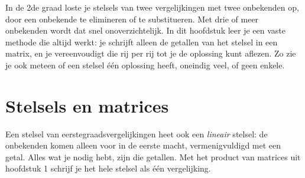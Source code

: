 %



In de 2de graad loste je stelsels van twee vergelijkingen met twee onbekenden op, door een onbekende te elimineren of te substitueren. Met drie of meer onbekenden wordt dat snel onoverzichtelijk. In dit hoofdstuk leer je een vaste methode die altijd werkt: je schrijft alleen de getallen van het stelsel in een matrix, en je vereenvoudigt die rij per rij tot je de oplossing kunt aflezen. Zo zie je ook meteen of een stelsel één oplossing heeft, oneindig veel, of geen enkele.

\begin{oefeningen}[Start]

\end{oefeningen}


\section{Stelsels en matrices}

Een stelsel van eerstegraadsvergelijkingen heet ook een \textit{lineair} stelsel: de onbekenden komen alleen voor in de eerste macht, vermenigvuldigd met een getal. Alles wat je nodig hebt, zijn die getallen. Met het product van matrices uit hoofdstuk 1 schrijf je het hele stelsel als één vergelijking.

